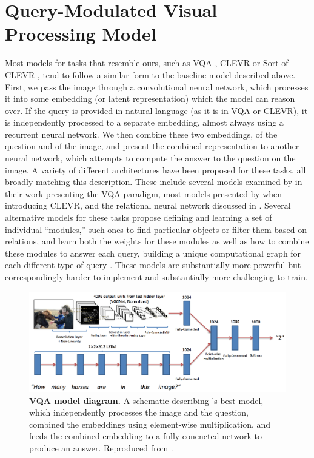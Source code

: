 \section{Query-Modulated Visual Processing Model}

Most models for tasks that resemble ours, such as VQA \parencite{Antol2015,Agrawal2016}, CLEVR \parencite{Johnson2017}  or Sort-of-CLEVR \parencite{Santoro}, tend to follow a similar form to the baseline model described above. First, we pass the image through a convolutional neural network, which processes it into some embedding (or latent representation) which the model can reason over. If the query is provided in natural language (as it is in VQA or CLEVR), it is independently processed to a separate embedding, almost always using a recurrent neural network. We then combine these two embeddings, of the question and of the image, and present the combined representation to another neural network, which attempts to compute the answer to the question on the image. A variety of different architectures have been proposed for these tasks, all broadly matching this description. These include several models examined by \textcite{Antol2015} in their work presenting the VQA paradigm, most models presented by \cite{Johnson2017} when introducing CLEVR, and the relational neural network discussed in \textcite{Santoro}. Several alternative models for these tasks propose defining and learning a set of individual ``modules,'' such ones to find particular objects or filter them based on relations, and learn both the weights for these modules as well as how to combine these modules to answer each query, building a unique computational graph for each different type of query \parencite{Johnson,Hu2017}. These models are substantially more powerful but correspondingly harder to implement and substantially more challenging to train.
\begin{figure}[!htb]
\centering
\includegraphics[width=\linewidth]{ch-models-compared/figures/reproduced.png}
\caption{{\bf VQA model diagram.} A schematic describing 's best model, which independently processes the image and the question, combined the embeddings using element-wise multiplication, and feeds the combined embedding to a fully-conencted network to produce an answer. Reproduced from \textcite{Agrawal2016}.}
\label{fig:vqa-model-diagram}
\end{figure}


